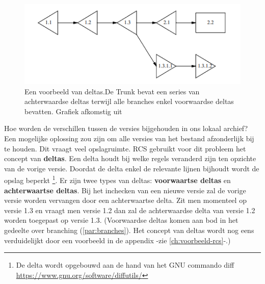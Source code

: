 \begin{figure}
\begin{center}
  	\includegraphics[scale=0.6]{deltas.png}
\end{center}
\caption[Voorbeeld van deltas.]{Een voorbeeld van deltas.De Trunk bevat een series van achterwaardse deltas terwijl alle branches enkel voorwaardse deltas bevatten. Grafiek afkomstig uit \textcite{Tichy85rcs}}\label{fig_deltas}
\end{figure}

Hoe worden de verschillen tussen de versies bijgehouden in ons lokaal archief? Een mogelijke oplossing zou zijn om alle versies van het bestand afzonderlijk bij te houden. Dit vraagt veel opslagruimte. RCS gebruikt voor dit probleem het concept van \textbf{deltas}. Een delta houdt bij welke regels veranderd zijn ten opzichte van de vorige versie. Doordat de delta enkel de relevante lijnen bijhoudt wordt de opslag beperkt \footnote{De delta wordt opgebouwd aan de hand van het GNU commando diff \url{https://www.gnu.org/software/diffutils/}}. Er zijn twee types van deltas: \textbf{voorwaartse deltas} en \textbf{achterwaartse deltas}. Bij het inchecken van een nieuwe versie zal de vorige versie worden vervangen door een achterwaartse delta. Zit men momenteel op versie 1.3 en  vraagt men versie 1.2 dan zal de achterwaardse delta van versie 1.2 worden toegepast op versie 1.3. (Voorwaardse deltas komen aan bod in het gedeelte over branching (\ref{par:branches}). Het concept van deltas wordt nog eens verduidelijkt door een voorbeeld in de appendix -zie \ref{ch:voorbeeld-rcs}-.)\\

